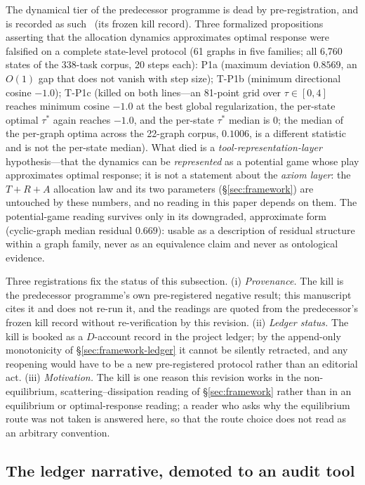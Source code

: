 \documentclass[11pt,a4paper]{article}
\begin{document}
The dynamical tier of the predecessor programme is dead by pre-registration, and is recorded as such~\cite{deposon2026} (its frozen kill record). Three formalized propositions asserting that the allocation dynamics approximates optimal response were falsified on a complete state-level protocol (61 graphs in five families; all 6,760 states of the 338-task corpus, 20 steps each): P1a (maximum deviation $0.8569$, an $O(1)$ gap that does not vanish with step size); T-P1b (minimum directional cosine $-1.0$); T-P1c (killed on both lines---an 81-point grid over $\tau\in[0,4]$ reaches minimum cosine $-1.0$ at the best global regularization, the per-state optimal $\tau^{*}$ again reaches $-1.0$, and the per-state $\tau^{*}$ median is $0$; the median of the per-graph optima across the 22-graph corpus, $0.1006$, is a different statistic and is not the per-state median). What died is a \emph{tool-representation-layer} hypothesis---that the dynamics can be \emph{represented} as a potential game whose play approximates optimal response; it is not a statement about the \emph{axiom layer}: the $T+R+A$ allocation law and its two parameters (\S\ref{sec:framework}) are untouched by these numbers, and no reading in this paper depends on them. The potential-game reading survives only in its downgraded, approximate form (cyclic-graph median residual $0.669$): usable as a description of residual structure within a graph family, never as an equivalence claim and never as ontological evidence.

Three registrations fix the status of this subsection. (i) \emph{Provenance.} The kill is the predecessor programme's own pre-registered negative result; this manuscript cites it and does not re-run it, and the readings are quoted from the predecessor's frozen kill record without re-verification by this revision. (ii) \emph{Ledger status.} The kill is booked as a $D$-account record in the project ledger; by the append-only monotonicity of \S\ref{sec:framework-ledger} it cannot be silently retracted, and any reopening would have to be a new pre-registered protocol rather than an editorial act. (iii) \emph{Motivation.} The kill is one reason this revision works in the non-equilibrium, scattering--dissipation reading of \S\ref{sec:framework} rather than in an equilibrium or optimal-response reading; a reader who asks why the equilibrium route was not taken is answered here, so that the route choice does not read as an arbitrary convention.

\subsection{The ledger narrative, demoted to an audit tool}
\label{sec:boundary-ledger}
\end{document}
